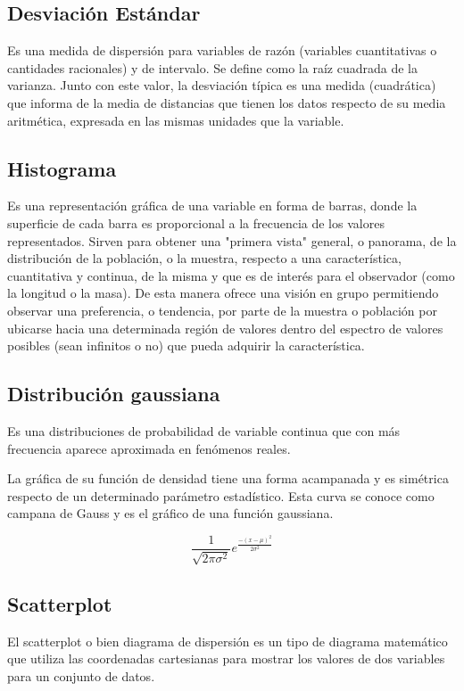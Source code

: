 \documentclass[a4paper]{article}
\begin{document}
\subsection{Desviación Estándar}
Es una medida de dispersión para variables de razón (variables cuantitativas o cantidades racionales) y de intervalo. Se define como la raíz cuadrada de la varianza. Junto con este valor, la desviación típica es una medida (cuadrática) que informa de la media de distancias que tienen los datos respecto de su media aritmética, expresada en las mismas unidades que la variable.

\subsection{Histograma}
Es una representación gráfica de una variable en forma de barras, donde la superficie de cada barra es proporcional a la frecuencia de los valores representados. Sirven para obtener una "primera vista" general, o panorama, de la distribución de la población, o la muestra, respecto a una característica, cuantitativa y continua, de la misma y que es de interés para el observador (como la longitud o la masa). De esta manera ofrece una visión en grupo permitiendo observar una preferencia, o tendencia, por parte de la muestra o población por ubicarse hacia una determinada región de valores dentro del espectro de valores posibles (sean infinitos o no) que pueda adquirir la característica.


\subsection{Distribución gaussiana}
Es una distribuciones de probabilidad de variable continua que con más frecuencia aparece aproximada en fenómenos reales.

La gráfica de su función de densidad tiene una forma acampanada y es simétrica respecto de un determinado parámetro estadístico. Esta curva se conoce como campana de Gauss y es el gráfico de una función gaussiana.

$$\frac{1}{\sqrt{2\pi \sigma^2}}e^\frac{-(x-\mu)^2}{2 \sigma^2}$$

\subsection{Scatterplot}
El scatterplot o bien diagrama de dispersión es un tipo de diagrama matemático que utiliza las coordenadas cartesianas para mostrar los valores de dos variables para un conjunto de datos.
\end{document}
